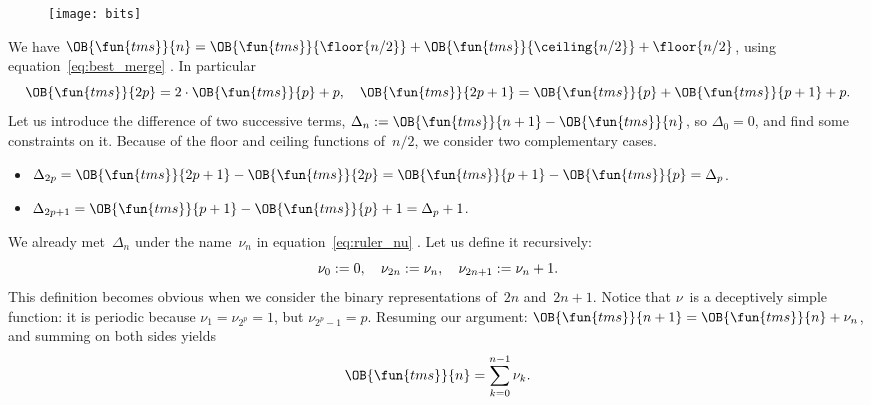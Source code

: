 {\setlength{\intextsep}{0pt} %
\begin{wrapfigure}[22]{r}[0pt]{0pt}
\centering
\texttt{[image: bits]}
\caption{}
\label{fig:bits}
\end{wrapfigure}
We have \(\OB{\fun{tms}}{n} = \OB{\fun{tms}}{\floor{n/2}} +
\OB{\fun{tms}}{\ceiling{n/2}} + \floor{n/2}\), using
equation~\eqref{eq:best_merge}
. In particular
\begin{equation*}
\OB{\fun{tms}}{2p} = 2 \cdot \OB{\fun{tms}}{p} + p,\quad
\OB{\fun{tms}}{2p+1} = \OB{\fun{tms}}{p} + \OB{\fun{tms}}{p+1} + p.
\end{equation*}
Let us introduce the difference of two successive terms, \(\Delta_n :=
\OB{\fun{tms}}{n+1} - \OB{\fun{tms}}{n}\), so \(\Delta_0 = 0\), and
find some constraints on it. Because of the floor and ceiling
functions of~\(n/2\), we consider two complementary cases.
\begin{itemize}

 \item \(\Delta_{2p} = \OB{\fun{tms}}{2p+1} - \OB{\fun{tms}}{2p} =
  \OB{\fun{tms}}{p+1} - \OB{\fun{tms}}{p} = \Delta_{p}\).

  \item \(\Delta_{2p+1} = \OB{\fun{tms}}{p+1} - \OB{\fun{tms}}{p} + 1 =
  \Delta_{p} + 1\).

\end{itemize}
We already met~\(\Delta_n\) under the name~\(\nu_n\) in
equation~\eqref{eq:ruler_nu} . Let us define it
recursively:%
\begin{equation}
\nu_{0} := 0,\quad \nu_{2n} := \nu_{n},\quad
\nu_{2n+1} := \nu_{n} + 1.\label{def:nu}\index{bit sum}
\end{equation}
This definition becomes obvious when we consider the binary
representations of~\(2n\) and~\(2n+1\). Notice that \(\nu\)~is a
deceptively simple function: it is periodic because \(\nu_{1} =
\nu_{2^p} = 1\), but \(\nu_{2^p-1}=p\). Resuming our argument:
\(\OB{\fun{tms}}{n+1} = \OB{\fun{tms}}{n} + \nu_n\), and summing on
both sides yields
\begin{equation}
\OB{\fun{tms}}{n} = \sum_{k=0}^{n-1}{\nu_k}.\label{eq:OB_tms}
\index{tms@$\OB{\fun{tms}}{n}$}
\end{equation}}

